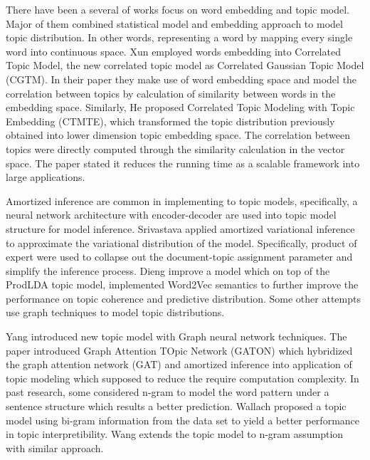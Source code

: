 There have been a several of works focus on word embedding and topic model. Major of them combined statistical model and embedding approach to model topic distribution. In other words, representing a word by mapping every single word into continuous space.
Xun \cite{xun_correlated_2017} employed words embedding into Correlated Topic Model, the new correlated topic model as Correlated Gaussian Topic Model (CGTM). In their paper they make use of word embedding space and model the correlation between topics by calculation of similarity between words in the embedding space.
Similarly, He\cite{he_efficient_2017} proposed Correlated Topic Modeling with Topic Embedding (CTMTE), which transformed the topic distribution previously obtained into lower dimension topic embedding space. The correlation between topics were directly computed through the similarity calculation in the vector space. The paper stated it reduces the running time as a scalable framework into large applications.

Amortized inference\cite{kingma_auto-encoding_2014} are common in implementing to topic models, specifically, a neural network architecture with encoder-decoder are used into topic model structure for model inference.
Srivastava\cite{srivastava_autoencoding_2017} applied amortized variational inference to approximate the variational distribution of the model. Specifically, product of expert were used to collapse out the document-topic assignment parameter and simplify the inference process.
Dieng\cite{dieng_topic_2019} improve a model which on top of the ProdLDA topic model, implemented Word2Vec semantics to further improve the performance on topic coherence and predictive distribution.
Some other attempts use graph techniques to model topic distributions.

Yang\cite{yang_graph_2020} introduced new topic model with Graph neural network techniques. The paper introduced Graph Attention TOpic Network (GATON) which hybridized the graph attention network (GAT) and amortized inference into application of topic modeling which supposed to reduce the require computation complexity.
In past research, some considered n-gram to model the word pattern under a sentence structure which results a better prediction.
Wallach \cite{wallach_topic_2006} proposed a topic model using bi-gram information from the data set to yield a better performance in topic interpretibility.
Wang \cite{wang_topical_2007} extends the topic model to n-gram assumption with similar approach.

